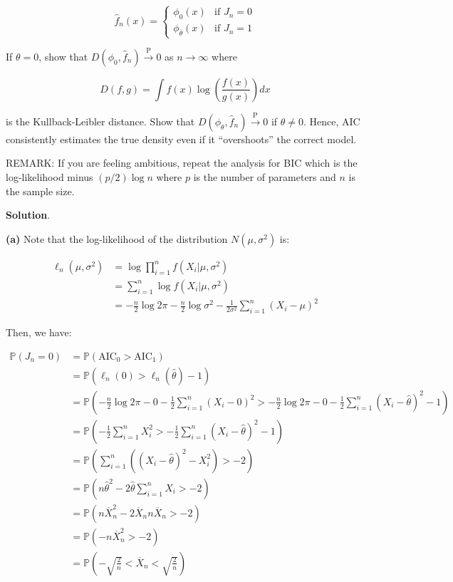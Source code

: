 \[ \hat{f}_n(x) = \begin{cases}
\phi_0(x) & \text{if } J_n = 0 \\
\phi_\overline{\theta}(x) & \text{if } J_n = 1
\end{cases}\]

If \(\theta = 0\), show that
\(D(\phi_0, \hat{f}_n) \xrightarrow{\text{P}} 0\) as
\(n \rightarrow \infty\) where

\[ D(f, g) = \int f(x) \log \left( \frac{f(x)}{g(x)} \right) dx \]

is the Kullback-Leibler distance. Show that
\(D(\phi_\theta, \hat{f}_n) \xrightarrow{\text{P}} 0\) if
\(\theta \neq 0\). Hence, AIC consistently estimates the true density
even if it ``overshoots'' the correct model.

REMARK: If you are feeling ambitious, repeat the analysis for BIC which
is the log-likelihood minus \((p / 2) \log n\) where \(p\) is the number
of parameters and \(n\) is the sample size.

\textbf{Solution}.

\textbf{(a)} Note that the log-likelihood of the distribution
\(N(\mu, \sigma^2)\) is:

\begin{align}
\ell_n(\mu, \sigma^2) &= \log \prod_{i=1}^n f(X_i | \mu, \sigma^2) \\
&= \sum_{i=1}^n \log f(X_i | \mu, \sigma^2) \\
&= - \frac{n}{2} \log 2\pi - \frac{n}{2} \log \sigma^2 - \frac{1}{2\sigma^2} \sum_{i=1}^n (X_i - \mu)^2
\end{align}

Then, we have:

\begin{align}
\mathbb{P}(J_n = 0) &= \mathbb{P}(\text{AIC}_0 > \text{AIC}_1) \\
&= \mathbb{P}(\ell_n(0) > \ell_n(\hat{\theta}) - 1) \\
&= \mathbb{P} \left(-\frac{n}{2} \log 2\pi - 0 - \frac{1}{2} \sum_{i=1}^n (X_i - 0)^2 > -\frac{n}{2} \log 2\pi - 0 - \frac{1}{2} \sum_{i=1}^n (X_i - \hat{\theta})^2 - 1 \right) \\
&= \mathbb{P}\left( -\frac{1}{2} \sum_{i=1}^n X_i^2 > -\frac{1}{2} \sum_{i=1}^n (X_i - \hat{\theta})^2 - 1\right) \\
&= \mathbb{P}\left( \sum_{i=1}^n \left((X_i - \hat{\theta})^2 - X_i^2 \right) > -2 \right) \\
&= \mathbb{P}\left( n \hat{\theta}^2 - 2 \hat{\theta} \sum_{i=1}^n X_i > -2 \right) \\
&= \mathbb{P}\left( n \overline{X}_n^2 - 2 \overline{X}_n n \overline{X}_n > -2\right) \\
&= \mathbb{P}\left( -n \overline{X}_n^2 > -2 \right) \\
&= \mathbb{P}\left(-\sqrt{\frac{2}{n}} < \overline{X}_n < \sqrt{\frac{2}{n}} \right)
\end{align}

